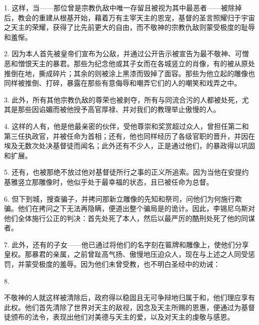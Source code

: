 1. 这样，当——那位曾是宗教仇敌中唯一存留且被视为其中最恶者——被除掉后，教会的重建从根基开始，藉着万有主宰天主的恩宠，基督的圣言照耀归于宇宙之天主的荣耀，获得了比先前更大的自由，而不敬神的宗教仇敌则蒙受极度的耻辱和羞惭。\par

2. 因为本人首先被皇帝们宣布为公敌，并通过公开告示被宣告为最不敬神、可憎恶和憎恨天主的暴君。那些为纪念他或其子女而在各城竖立的肖像，有的被从原处推倒在地，撕成碎片；其余的则被涂上黑漆而毁掉了面容。那些为他立起的雕像也同样被推倒、打碎，暴露在那些有意侮辱和嘲弄它们的人的嘲笑和戏弄之中。\par

3. 此外，所有其他宗教仇敌的尊荣也被剥夺，所有与同流合污的人都被处死，尤其是那些因谄媚而被他授予高官厚禄、并对我们的教理举止傲慢的人。\par

4. 这样的人有，他是他最亲密的伙伴，受他尊崇和奖赏超过众人，曾担任第二和第三任执政官，并被任命为首相；还有，他也同样经历了各级官职的晋升，并因在埃及无数次处决基督徒而闻名；此外还有不少人，正是通过他们，的暴政得以巩固和扩展。\par

5. 还有，也被那绝不放过他对基督徒所行之事的正义所追索。因为当他在安提约基雅竖立那雕像时，他似乎处于最幸福的状态，且已被任命为总督。\par

6. 但下到城，搜查骗子，并拷问那新立雕像的先知和祭司，问他们为何施行欺骗。他们在拷问之下无法再隐瞒，便道出整个骗局是的诡计。因此，李锡尼乌斯对他们全体施行公正的判决：首先处死了本人，然后以最严厉的酷刑处死了他的同谋者。\par

7. 此外，还有的子女——他已通过将他们的名字刻在匾牌和雕像上，使他们分享皇权。那暴君的亲属，之前曾趾高气扬、傲慢地压迫众人，现在与上述之人同受惩罚，并蒙受极度的羞辱。因为他们未曾受教，也不明白圣经中的劝诫：\par

8. \par

不敬神的人就这样被清除后，政府得以稳固且无可争辩地归属于和，他们理应享有此权。他们首先清除了世界对天主的敌视，因念及天主所赐的恩惠，便通过为基督徒颁布的法令，表现出他们对美德与天主的爱，以及对天主的虔敬与感恩。\par

